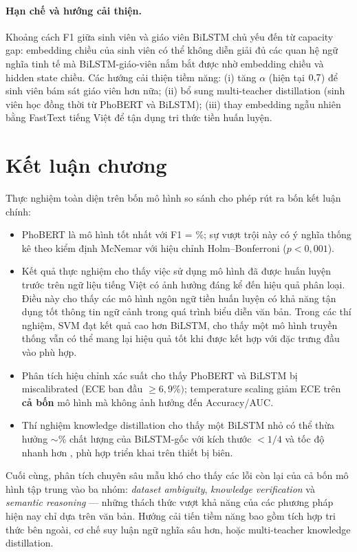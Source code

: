 \paragraph*{Hạn chế và hướng cải thiện.}
Khoảng cách F1 giữa sinh viên và giáo viên BiLSTM chủ yếu đến từ capacity gap: embedding \studentembdim{} chiều của sinh viên có thể không diễn giải đủ các quan hệ ngữ nghĩa tinh tế mà BiLSTM-giáo-viên nắm bắt được nhờ embedding \bilstmembdim{} chiều và hidden state \bilstmhiddendim{} chiều. Các hướng cải thiện tiềm năng: (i) tăng $\alpha$ (hiện tại $0{,}7$) để sinh viên bám sát giáo viên hơn nữa; (ii) bổ sung multi-teacher distillation (sinh viên học đồng thời từ PhoBERT và BiLSTM); (iii) thay embedding ngẫu nhiên bằng FastText tiếng Việt để tận dụng tri thức tiền huấn luyện.



\section{Kết luận chương}

Thực nghiệm toàn diện trên bốn mô hình so sánh cho phép rút ra bốn kết luận chính:

\begin{itemize}[leftmargin=2em]
  \item PhoBERT là mô hình tốt nhất với F1 = \phobertfone\%; sự vượt trội này có ý nghĩa thống kê theo kiểm định McNemar với hiệu chỉnh Holm--Bonferroni ($p < 0{,}001$).
  \item Kết quả thực nghiệm cho thấy việc sử dụng mô hình đã được huấn luyện trước trên ngữ liệu tiếng Việt có ảnh hưởng đáng kể đến hiệu quả phân loại. Điều này cho thấy các mô hình ngôn ngữ tiền huấn luyện có khả năng tận dụng tốt thông tin ngữ cảnh trong quá trình biểu diễn văn bản. Trong các thí nghiệm, SVM đạt kết quả cao hơn BiLSTM, cho thấy một mô hình truyền thống vẫn có thể mang lại hiệu quả tốt khi được kết hợp với đặc trưng đầu vào phù hợp.
  \item Phân tích hiệu chỉnh xác suất cho thấy PhoBERT và BiLSTM bị miscalibrated (ECE ban đầu $\geq 6{,}9\%)$; temperature scaling giảm ECE trên \textbf{cả bốn} mô hình mà không ảnh hưởng đến Accuracy/AUC.
  \item Thí nghiệm knowledge distillation cho thấy một BiLSTM nhỏ có thể thừa hưởng $\sim$\studentretainbI{}\% chất lượng của BiLSTM-gốc với kích thước $< 1/4$ và tốc độ nhanh hơn \studentspeedup{$\times$}, phù hợp triển khai trên thiết bị biên.
\end{itemize}

Cuối cùng, phân tích chuyên sâu \nhardexamples{} mẫu khó cho thấy các lỗi còn lại của cả bốn mô hình tập trung vào ba nhóm: \textit{dataset ambiguity}, \textit{knowledge verification} và \textit{semantic reasoning} --- những thách thức vượt khả năng của các phương pháp hiện nay chỉ dựa trên văn bản. Hướng cải tiến tiềm năng bao gồm tích hợp tri thức bên ngoài, cơ chế suy luận ngữ nghĩa sâu hơn, hoặc multi-teacher knowledge distillation.

\clearpage
